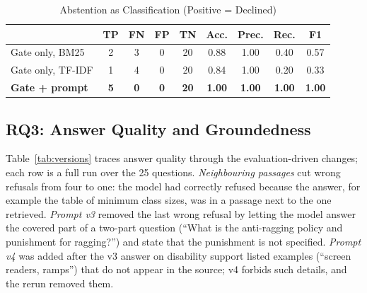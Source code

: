 \documentclass[conference]{IEEEtran}
\begin{document}
\begin{table}[t]
\caption{Abstention as Classification (Positive = Declined)}
\label{tab:abstain}
\centering
\footnotesize
\setlength{\tabcolsep}{2.2pt}
\begin{tabular}{@{}lcccccccc@{}}
\toprule
& \textbf{TP} & \textbf{FN} & \textbf{FP} & \textbf{TN} & \textbf{Acc.} & \textbf{Prec.} & \textbf{Rec.} & \textbf{F1} \\
\midrule
Gate only, BM25 & 2 & 3 & 0 & 20 & 0.88 & 1.00 & 0.40 & 0.57 \\
Gate only, TF-IDF & 1 & 4 & 0 & 20 & 0.84 & 1.00 & 0.20 & 0.33 \\
\textbf{Gate + prompt} & \textbf{5} & \textbf{0} & \textbf{0} & \textbf{20} & \textbf{1.00} & \textbf{1.00} & \textbf{1.00} & \textbf{1.00} \\
\bottomrule
\end{tabular}
\end{table}

\subsection{RQ3: Answer Quality and Groundedness}
Table~\ref{tab:versions} traces answer quality through the evaluation-driven changes; each row is a full run over the 25 questions. \emph{Neighbouring passages} cut wrong refusals from four to one: the model had correctly refused because the answer, for example the table of minimum class sizes, was in a passage next to the one retrieved. \emph{Prompt v3} removed the last wrong refusal by letting the model answer the covered part of a two-part question (``What is the anti-ragging policy and punishment for ragging?'') and state that the punishment is not specified. \emph{Prompt v4} was added after the v3 answer on disability support listed examples (``screen readers, ramps'') that do not appear in the source; v4 forbids such details, and the rerun removed them.
\end{document}
